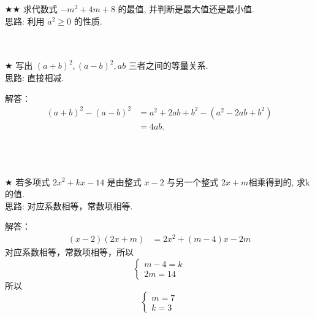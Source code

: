 \begin{comment}
\item {
    求代数式 $y^2 +10y + 27$ 的最小值. 
    \ifshowSolution
        \fangsong\zihao{4}
        \\
        思路: 将原式整理成 $(y + m)^2 + k$ 的形式; 再利用 $a \geq 0$ 的性质，计算出原式的最小值. 
    \else
        \\ \\ \\
    \fi
}
\end{comment}

\item {
    $\bigstar\bigstar$
    求代数式 $-m^2 + 4m + 8$ 的最值, 并判断是最大值还是最小值. 
    \ifshowSolution
        \fangsong{}
        \\
        思路: 利用 $a^2 \geq 0$ 的性质. 
    \else
        \\ \\ \\
    \fi
}

\item {
    $\bigstar$
    写出 $(a+b)^2, (a-b)^2, ab$ 三者之间的等量关系. 
    \ifshowSolution
        \fangsong{}
        \\
        思路: 直接相减. 

        解答：
        \begin{align*}
            (a+b)^2 - (a-b)^2 &= a^2 + 2ab + b^2 - (a^2 - 2ab + b^2) \\
            &= 4ab. 
        \end{align*}
    \else
        \\ \\ \\
    \fi
}

\item {
    $\bigstar$
    若多项式 $2x^2 + kx - 14$ 是由整式 $x-2$ 与另一个整式 $2x+m$相乘得到的, 求k的值. 
    \ifshowSolution
        \fangsong{}
        \\
        思路: 对应系数相等，常数项相等. 

        解答：
        \begin{align*}
            (x-2)(2x+m) &= 2x^2 + (m-4)x - 2m
        \end{align*}
        对应系数相等，常数项相等，所以
        \[\left\{ 
            \begin{array}{lc}
                m-4 = k \\
                2m = 14
            \end{array}
        \right. \]
        所以
        \[\left\{ 
            \begin{array}{lc}
                m = 7 \\
                k = 3
            \end{array}
        \right. \]
    \else
        \\ \\ \\
    \fi
}

